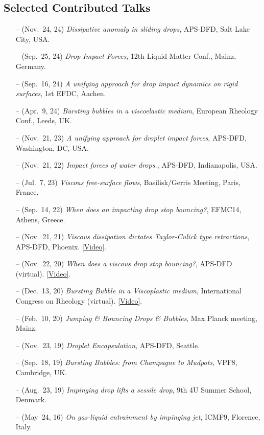 \documentclass[10pt,a4paper,colorlinks,linkcolor=blue,urlcolor=blue,citecolor=blue]{moderncv}
\begin{document}
\subsection{Selected Contributed Talks}
\begin{itemize}[leftmargin=1.25em]
\item[--] (Nov.~24, 24) \emph{Dissipative anomaly in sliding drops}, APS-DFD, Salt Lake City, USA.
\item[--] (Sep.~25, 24) \emph{Drop Impact Forces}, 12th Liquid Matter Conf., Mainz, Germany.
\item[--] (Sep.~16, 24) \emph{A unifying approach for drop impact dynamics on rigid surfaces}, 1st EFDC, Aachen.
\item[--] (Apr.~9, 24) \emph{Bursting bubbles in a viscoelastic medium}, European Rheology Conf., Leeds, UK.
\item[--] (Nov.~21, 23) \emph{A unifying approach for droplet impact forces}, APS-DFD, Washington, DC, USA.
\item[--] (Nov.~21, 22) \emph{Impact forces of water drops.}, APS-DFD, Indianapolis, USA.
\item[--] (Jul.~7, 23) \emph{Viscous free-surface flows}, Basilisk/Gerris Meeting, Paris, France.
\item[--] (Sep.~14, 22) \emph{When does an impacting drop stop bouncing?}, EFMC14, Athens, Greece.
\item[--] (Nov.~21, 21) \emph{Viscous dissipation dictates Taylor-Culick type retractions}, APS-DFD, Phoenix. \href{https://youtu.be/d0tMlpbMIqY?si=V-7Lh5g-zj1j7al6}{[Video]}.
\item[--] (Nov.~22, 20) \emph{When does a viscous drop stop bouncing?}, APS-DFD (virtual). \href{https://youtu.be/9JCV9JFwr2A?si=Vs1ljwdmZrzHUOXX}{[Video]}.
\item[--] (Dec.~13, 20) \emph{Bursting Bubble in a Viscoplastic medium}, International Congress on Rheology (virtual). \href{https://youtu.be/52D6nfaHbYg?si=lE3oQGiMZe3UCT6j}{[Video]}.
\item[--] (Feb.~10, 20) \emph{Jumping \& Bouncing Drops \& Bubbles}, Max Planck meeting, Mainz.
\item[--] (Nov.~23, 19) \emph{Droplet Encapsulation}, APS-DFD, Seattle.
\item[--] (Sep.~18, 19) \emph{Bursting Bubbles: from Champagne to Mudpots}, VPF8, Cambridge, UK.
\item[--] (Aug.~23, 19) \emph{Impinging drop lifts a sessile drop}, 9th 4U Summer School, Denmark.
\item[--] (May~24, 16) \emph{On gas-liquid entrainment by impinging jet}, ICMF9, Florence, Italy.
\end{itemize}
\end{document}
